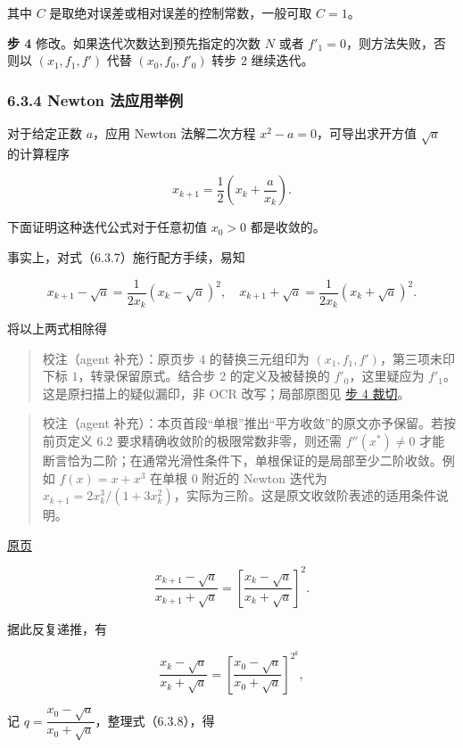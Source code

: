 \documentclass[
  10pt,
  fontset=fandol]{ctexart}
\begin{document}
其中 \(C\) 是取绝对误差或相对误差的控制常数，一般可取 \(C=1\)。

\textbf{步 4} 修改。如果迭代次数达到预先指定的次数 \(N\) 或者 \(f'_1=0\)，则方法失败，否则以 \((x_1,f_1,f')\) 代替 \((x_0,f_0,f'_0)\) 转步 2 继续迭代。

\subsubsection{6.3.4 Newton 法应用举例}\label{newton-ux6cd5ux5e94ux7528ux4e3eux4f8b}

对于给定正数 \(a\)，应用 Newton 法解二次方程 \(x^2-a=0\)，可导出求开方值 \(\sqrt{a}\) 的计算程序

\[
x_{k+1}=\frac{1}{2}\left(x_k+\frac{a}{x_k}\right).
\tag{6.3.7}
\]

下面证明这种迭代公式对于任意初值 \(x_0>0\) 都是收敛的。

事实上，对式（6.3.7）施行配方手续，易知

\[
x_{k+1}-\sqrt{a}=\frac{1}{2x_k}(x_k-\sqrt{a})^2,\quad
x_{k+1}+\sqrt{a}=\frac{1}{2x_k}(x_k+\sqrt{a})^2.
\]

将以上两式相除得

\begin{quote}
校注（agent 补充）：原页步 4 的替换三元组印为 \((x_1,f_1,f')\)，第三项未印下标 \(1\)，转录保留原式。结合步 2 的定义及被替换的 \(f'_0\)，这里疑应为 \(f'_1\)。这是原扫描上的疑似漏印，非 OCR 改写；局部原图见 \href{../assets/ch06/detail-p165-step4.png}{步 4 裁切}。
\end{quote}

\begin{quote}
校注（agent 补充）：本页首段``单根''推出``平方收敛''的原文亦予保留。若按前页定义 6.2 要求精确收敛阶的极限常数非零，则还需 \(f''(x^*)\ne0\) 才能断言恰为二阶；在通常光滑性条件下，单根保证的是局部至少二阶收敛。例如 \(f(x)=x+x^3\) 在单根 \(0\) 附近的 Newton 迭代为 \(x_{k+1}=2x_k^3/(1+3x_k^2)\)，实际为三阶。这是原文收敛阶表述的适用条件说明。
\end{quote}

\href{../../source-images/pdf-166.jpeg}{原页}

\[
\frac{x_{k+1}-\sqrt{a}}{x_{k+1}+\sqrt{a}}=\left[\frac{x_k-\sqrt{a}}{x_k+\sqrt{a}}\right]^2.
\]

据此反复递推，有

\[
\frac{x_k-\sqrt{a}}{x_k+\sqrt{a}}=\left[\frac{x_0-\sqrt{a}}{x_0+\sqrt{a}}\right]^{2^k},
\tag{6.3.8}
\]

记 \(q=\dfrac{x_0-\sqrt{a}}{x_0+\sqrt{a}}\)，整理式（6.3.8），得
\end{document}
